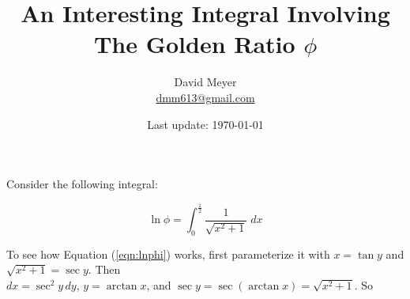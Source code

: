 \documentclass{article}
\title{An Interesting Integral Involving The Golden Ratio $\phi$}
\author{David Meyer \\ \href{mailto:dmm613@gmail.com}{dmm613@gmail.com}}
\date{Last update: \today}
\theoremstyle{definition}
\begin{document}
\maketitle
%
%
%
\noindent
Consider the following integral:

{\Large
\begin{equation}
\ln \phi = \int_{0}^{\frac{1}{2}} \dfrac{1}{\sqrt{x^{2} + 1}} \; dx
\label{eqn:lnphi}
\end{equation}
}

\bigskip
{
\noindent
To see how Equation (\ref{eqn:lnphi}) works, first 
parameterize it with 
$x = \tan y$ and $\sqrt{x^{2}+1} = \sec y$. Then \\
$dx = \sec^2 y \, dy$, $y = \arctan x$, and 
$\sec y = \sec (\arctan x) = \sqrt{x^{2}+1}$. 
So \par}
\end{document}
